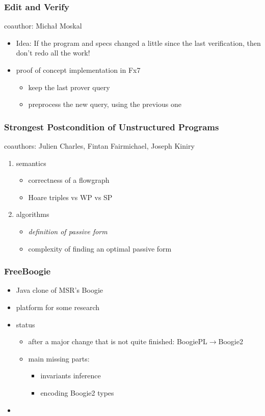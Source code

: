 \documentclass{beamer}
\begin{document}
\begin{frame}
  \frametitle{Edit and Verify}
  coauthor: Micha{\l} Moskal\bigskip
  \begin{itemize}
  \item Idea: If the program and specs changed a little since
    the last verification, then don't redo all the work!
  \item proof of concept implementation in Fx7
    \begin{itemize}
    \item keep the last prover query
    \item preprocess the new query, using the previous one
    \end{itemize}
  \end{itemize}
\end{frame}

\begin{frame}
  \frametitle{Strongest Postcondition of Unstructured Programs}
  coauthors: Julien Charles, Fintan Fairmichael, Joseph Kiniry
  \bigskip
  \begin{enumerate}
  \item semantics
    \begin{itemize}
    \item correctness of a flowgraph
    \item Hoare triples vs WP vs SP
    \end{itemize}
  \item algorithms
    \begin{itemize}
    \item \emph{definition of passive form}
    \item complexity of finding an optimal passive form
    \end{itemize}
  \end{enumerate}
\end{frame}

\begin{frame}
  \frametitle{FreeBoogie}
  \begin{itemize}
  \item Java clone of MSR's Boogie
  \item platform for some research
  \item status
    \begin{itemize}
    \item after a major change that is not quite finished:
      BoogiePL$\to$Boogie2
    \item main missing parts:
      \begin{itemize}
      \item invariants inference
      \item encoding Boogie2 types
      \end{itemize}
    \end{itemize}
  \item 
  \end{itemize}
\end{frame}
\end{document}
